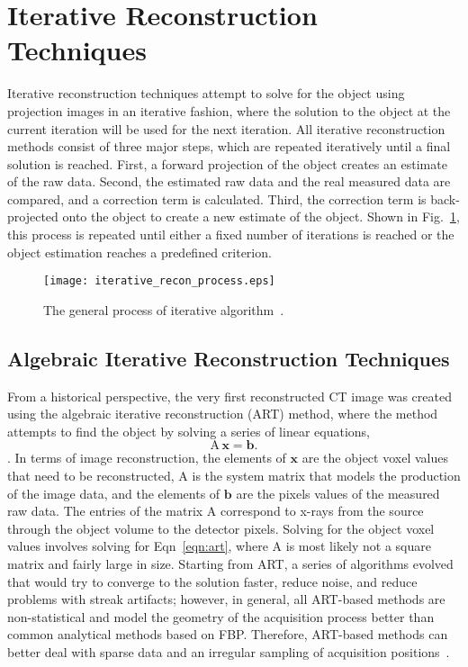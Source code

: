 \section{Iterative Reconstruction Techniques}
Iterative reconstruction techniques attempt to solve for the object using projection images in an iterative fashion, where the solution to the object at the current iteration will be used for the next iteration.  All iterative reconstruction methods consist of three major steps, which are repeated iteratively until a final solution is reached.  First, a forward projection of the object creates an estimate of the raw data.  Second, the estimated raw data and the real measured data are compared, and a correction term is calculated.  Third, the correction term is back-projected onto the object to create a new estimate of the object.  Shown in Fig.~\ref{fig:generalIR}, this process is repeated until either a fixed number of iterations is reached or the object estimation reaches a predefined criterion.
%
\begin{figure}
\centering
\texttt{[image: iterative\_recon\_process.eps]}
\caption{The general process of iterative algorithm~\citep{Beister2012}.}
\label{fig:generalIR}
\end{figure}

\subsection{Algebraic Iterative Reconstruction Techniques}
From a historical perspective, the very first reconstructed CT image was created using the algebraic iterative reconstruction (ART) method, where the method attempts to find the object by solving a series of linear equations,
%
\begin{equation}
\mathrm{A\,\mathbf{x} = \mathbf{b}}.
\label{eqn:art}
\end{equation}.  
%
In terms of image reconstruction, the elements of $\mathrm{\mathbf{x}}$ are the object voxel values that need to be reconstructed, $\mathrm{A}$ is the system matrix that models the production of the image data, and the elements of $\mathrm{\mathbf{b}}$ are the pixels values of the measured raw data.  The entries of the matrix $\mathrm{A}$ correspond to x-rays from the source through the object volume to the detector pixels.  Solving for the object voxel values involves solving for Eqn~\ref{eqn:art}, where $\mathrm{A}$ is most likely not a square matrix and fairly large in size.  Starting from ART, a series of algorithms evolved that would try to converge to the solution faster, reduce noise, and reduce problems with streak artifacts; however, in general, all ART-based methods are non-statistical and model the geometry of the acquisition process better than common analytical methods based on FBP.  Therefore, ART-based methods can better deal with sparse data and an irregular sampling of acquisition positions~\citep{Beister2012}.

